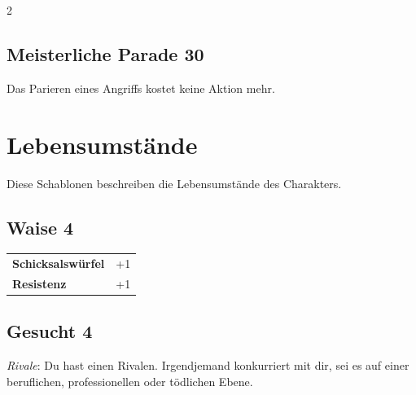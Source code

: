 \begin{multicols}{2}
\begin{tcolorbox}
\end{tcolorbox}

\begin{tcolorbox}
    \subsection*{Meisterliche Parade \hfill \small{30 }}
    \tcblower
Das Parieren eines Angriffs kostet keine Aktion mehr.


\vspace{3mm}



\end{tcolorbox}

\section{Lebensumstände}

Diese Schablonen beschreiben die Lebensumstände des Charakters.

\begin{tcolorbox}
    \subsection*{Waise \hfill \small{4 }}
    \tcblower




\begin{tabular}{@{}ll@{}}
    \textbf{Schicksalswürfel} & +1\\
    \textbf{Resistenz} & +1\\
\end{tabular}


\end{tcolorbox}

\begin{tcolorbox}
    \subsection*{Gesucht \hfill \small{4 }}
    \tcblower
\textit{Rivale}: Du hast einen Rivalen. Irgendjemand konkurriert mit dir, sei es auf einer beruflichen, professionellen oder tödlichen Ebene.



\end{tcolorbox}
\end{multicols}
